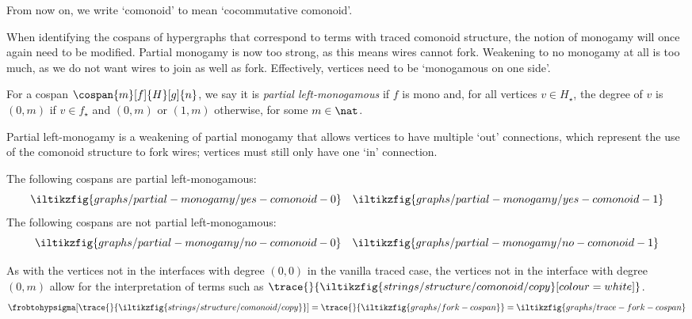 

From now on, we write `comonoid' to mean `cocommutative comonoid'.

When identifying the cospans of hypergraphs that correspond to terms with traced
comonoid structure, the notion of monogamy will once again need to be modified.
Partial monogamy is now too strong, as this means wires cannot fork.
Weakening to no monogamy at all is too much, as we do not want wires to join as
well as fork.
Effectively, vertices need to be `monogamous on one side'.

\begin{definition}
    For a cospan \(\cospan{m}[f]{H}[g]{n}\), we say it is
    \emph{partial left-monogamous} if \(f\) is mono and, for all vertices
    \(v \in H_\star\), the degree of \(v\) is \((0,m)\) if \(v \in f_\star\) and
    \((0,m)\) or \((1,m)\) otherwise, for some \(m \in \nat\).
\end{definition}

Partial left-monogamy is a weakening of partial monogamy that allows vertices
to have multiple `out' connections, which represent the use of the comonoid
structure to fork wires; vertices must still only have one `in' connection.

\begin{example}\label{ex:partial-left-monogamous}
    The following cospans are partial left-monogamous:
    \[
        \iltikzfig{graphs/partial-monogamy/yes-comonoid-0}
        \quad
        \iltikzfig{graphs/partial-monogamy/yes-comonoid-1}
    \]
    The following cospans are not partial left-monogamous:
    \[
        \iltikzfig{graphs/partial-monogamy/no-comonoid-0}
        \quad
        \iltikzfig{graphs/partial-monogamy/no-comonoid-1}
    \]
\end{example}

\begin{remark}
    As with the vertices not in the interfaces with degree \((0, 0)\) in the
    vanilla traced case, the vertices not in the interface with degree
    \((0, m)\) allow for the interpretation of terms such as \(
    \trace{}{\iltikzfig{strings/structure/comonoid/copy}[colour=white]}
    \).
    \begin{gather*}
        \frobtohypsigma[\trace{}{\iltikzfig{strings/structure/comonoid/copy}}]
        =
        \trace{}{\iltikzfig{graphs/fork-cospan}}
        =
        \iltikzfig{graphs/trace-fork-cospan}
    \end{gather*}
\end{remark}

